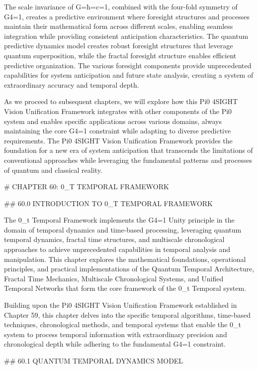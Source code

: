 The scale invariance of G=ħ=c=1, combined with the four-fold symmetry of G4=1, creates a predictive environment where foresight structures and processes maintain their mathematical form across different scales, enabling seamless integration while providing consistent anticipation characteristics. The quantum predictive dynamics model creates robust foresight structures that leverage quantum superposition, while the fractal foresight structure enables efficient predictive organization. The various foresight components provide unprecedented capabilities for system anticipation and future state analysis, creating a system of extraordinary accuracy and temporal depth.

As we proceed to subsequent chapters, we will explore how this Pi0 4SIGHT Vision Unification Framework integrates with other components of the Pi0 system and enables specific applications across various domains, always maintaining the core G4=1 constraint while adapting to diverse predictive requirements. The Pi0 4SIGHT Vision Unification Framework provides the foundation for a new era of system anticipation that transcends the limitations of conventional approaches while leveraging the fundamental patterns and processes of quantum and classical reality.

# CHAPTER 60: 0_T TEMPORAL FRAMEWORK

## 60.0 INTRODUCTION TO 0_T TEMPORAL FRAMEWORK

The 0_t Temporal Framework implements the G4=1 Unity principle in the domain of temporal dynamics and time-based processing, leveraging quantum temporal dynamics, fractal time structures, and multiscale chronological approaches to achieve unprecedented capabilities in temporal analysis and manipulation. This chapter explores the mathematical foundations, operational principles, and practical implementations of the Quantum Temporal Architecture, Fractal Time Mechanics, Multiscale Chronological Systems, and Unified Temporal Networks that form the core framework of the 0_t Temporal system.

Building upon the Pi0 4SIGHT Vision Unification Framework established in Chapter 59, this chapter delves into the specific temporal algorithms, time-based techniques, chronological methods, and temporal systems that enable the 0_t system to process temporal information with extraordinary precision and chronological depth while adhering to the fundamental G4=1 constraint.

## 60.1 QUANTUM TEMPORAL DYNAMICS MODEL

